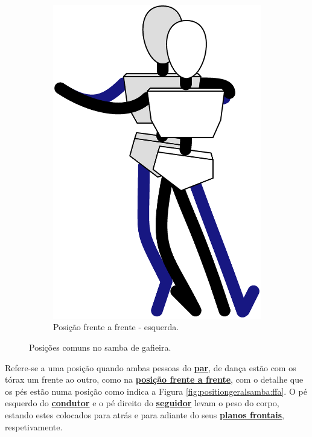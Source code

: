 \begin{figure}[!ht]
\begin{subfigure}[b]{0.285\textwidth}
         \centering
         \includegraphics[width=\textwidth]{chapters/cap-normas/position-ffe.eps}
         \caption{Posição frente a frente - esquerda.}
         \label{fig:positiongeralsamba:ffe}
     \end{subfigure}
\caption{Posições comuns no samba de gafieira.}
\label{fig:positiongeralsamba:2}
\end{figure}



\begin{definition}
\label{def:ffa-position}  
Refere-se a uma posição quando ambas pessoas do \hyperref[def:Par]{\textbf{par}}, 
de dança estão com os tórax um frente ao outro, 
como na \hyperref[def:frente-frente-position]{\textbf{posição frente a frente}},
com o detalhe que os pés estão numa posição como indica a Figura \ref{fig:positiongeralsamba:ffa}.
O pé esquerdo do \hyperref[def:Condutor]{\textbf{condutor}} e 
o pé direito do \hyperref[def:Seguidor]{\textbf{seguidor}} levam o peso do corpo,
estando estes colocados para atrás e para adiante do seus \hyperref[def:PlanoFrontal]{\textbf{planos frontais}}, 
respetivamente.
\end{definition}

